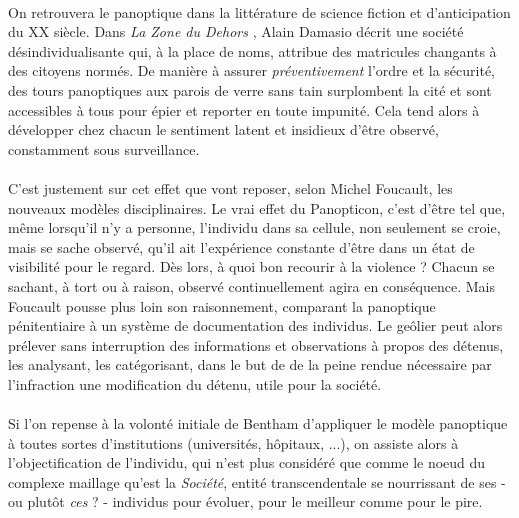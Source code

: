 \paragraph{} On retrouvera le panoptique dans la littérature de science fiction et d'anticipation du XX siècle.
Dans \emph{La Zone du Dehors} \cite{Damasio0}, Alain Damasio décrit une société désindividualisante qui, à la place
de noms, attribue des matricules changants à des citoyens normés. De manière à assurer \emph{préventivement} l'ordre et la
sécurité, des tours panoptiques aux parois de verre sans tain surplombent la cité et sont accessibles à tous pour épier
et reporter en toute impunité. Cela tend alors à développer chez chacun le sentiment latent et insidieux d'être observé, 
constamment sous surveillance.

\paragraph{} C'est justement sur cet effet que vont reposer, selon Michel Foucault, les nouveaux modèles disciplinaires.
\guillemotleft Le vrai effet du Panopticon, c'est d'être tel que, même lorsqu'il n'y a personne, l'individu dans sa
cellule, non seulement se croie, mais se sache observé, qu'il ait l'expérience constante d'être dans un état de visibilité
pour le regard. \guillemotright \cite{Foucault0} Dès lors, à quoi bon recourir à la violence ? Chacun se sachant, à tort
ou à raison, observé continuellement agira en conséquence. Mais Foucault pousse plus loin son raisonnement, comparant la
panoptique pénitentiaire à un système de documentation des individus. Le geôlier peut alors prélever sans interruption
des informations et observations à propos des détenus, les analysant, les catégorisant, dans le but de \guillemotleft 
[Faire] de la peine rendue nécessaire par l'infraction une modification du détenu, utile pour la société. \guillemotright

\paragraph{} Si l'on repense à la volonté initiale de Bentham d'appliquer le modèle panoptique à toutes sortes d'institutions
(universités, hôpitaux, ...), on assiste alors à l'objectification de l'individu, qui n'est plus considéré que comme le 
noeud du complexe maillage qu'est la \emph{Société}, entité transcendentale se nourrissant de ses - ou plutôt \emph{ces} ? - 
individus pour évoluer, pour le meilleur comme pour le pire.

